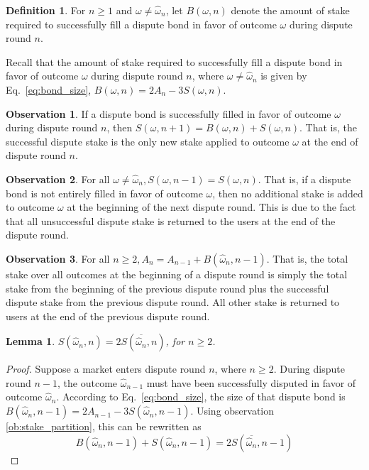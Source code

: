 \documentclass[floatfix,reprint,nofootinbib,amsmath,amssymb,epsfig,pre,floats,letterpaper,groupedaffiliation]{revtex4-1}
\newcommand{\beq}{\begin{equation}}
\newcommand{\eeq}{\end{equation}}
\newtheorem{lemma}[theorem]{Lemma}
\theoremstyle{definition}
\newtheorem{observation}{Observation}
\theoremstyle{definition}
\newtheorem{definition}{Definition}
\begin{document}
\begin{appendix}
\begin{definition}
For $n \geq 1$ and $\omega \neq \hat{\omega}_{n}$, let $B(\omega,n)$ denote the amount of stake required to successfully fill a dispute bond in favor of outcome $\omega$ during dispute round $n$.
\end{definition}

Recall that the amount of stake required to successfully fill a dispute bond in favor of outcome $\omega$ during dispute round $n$, where $\omega \neq \hat{\omega}_{n}$ is given by Eq.~\ref{eq:bond_size}, $B(\omega,n) = 2A_{n} - 3S(\omega,n)$.

\begin{observation}\label{ob:only_successfull_bond_stake_applies_v1}
If a dispute bond is successfully filled in favor of outcome $\omega$ during dispute round $n$, then $S(\omega,n+1)=B(\omega,n)+S(\omega,n)$.  That is, the successful dispute stake is the only new stake applied to outcome $\omega$ at the end of dispute round $n$.
\end{observation}

\begin{observation}\label{ob:only_successfull_bond_stake_applies_v2}
For all $\omega \neq \hat{\omega}_{n}, S(\omega,n-1)=S(\omega,n)$.  That is, if a dispute bond is not entirely filled in favor of outcome $\omega$, then no additional stake is added to outcome $\omega$ at the beginning of the next dispute round.  This is due to the fact that all unsuccessful dispute stake is returned to the users at the end of the dispute round.
\end{observation}

\begin{observation}\label{ob:only_successfull_bond_stake_applies_v3}
For all $n \geq 2, A_{n} = A_{n-1} + B(\hat{\omega}_{n},n-1)$.  That is, the total stake over all outcomes at the beginning of a dispute round is simply the total stake from the beginning of the previous dispute round plus the successful dispute stake from the previous dispute round.  All other stake is returned to users at the end of the previous dispute round.
\end{observation}

\begin{lemma}\label{le:tentative_outcomes_are_a_third_of_all_stake}
$S(\hat{\omega}_{n},n) = 2S(\overline{\hat{\omega}_{n}},n)$, for $n \geq 2$.
\end{lemma}

\begin{proof}
Suppose a market enters dispute round $n$, where $n \geq 2$.  During dispute round $n-1$, the outcome $\hat{\omega}_{n-1}$ must have been successfully disputed in favor of outcome $\hat{\omega}_{n}$.  According to Eq.~\ref{eq:bond_size}, the size of that dispute bond is $B(\hat{\omega}_{n},n-1) = 2A_{n-1} - 3S(\hat{\omega}_{n},n-1)$.  Using observation \ref{ob:stake_partition}, this can be rewritten as
\beq \label{eq:bond_size_stake_partition}
B(\hat{\omega}_{n},n-1) + S(\hat{\omega}_{n},n-1) = 2S(\overline{\hat{\omega}_{n}},n-1)
\eeq


\end{proof}
\end{appendix}
\end{document}
